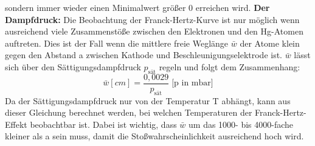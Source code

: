sondern immer wieder einen Minimalwert größer 0 erreichen wird.\newline
\textbf{Der Dampfdruck:}\newline
Die Beobachtung der Franck-Hertz-Kurve ist nur möglich wenn ausreichend viele Zusammenstöße zwischen den Elektronen und den Hg-Atomen auftreten. Dies ist der Fall  wenn die mittlere freie Weglänge $\bar{w}$ der Atome klein gegen den Abstand a zwischen Kathode und Beschleunigungselektrode ist. $\bar{w}$ lässt sich über den Sättigungsdampfdruck $p_{\text{sät}}$ regeln und folgt dem Zusammenhang:
\begin{equation*}
    \bar w [cm] = \frac{0,0029}{p_{\text{sät}}} \;\text{[p in mbar]}
\end{equation*}
\noindent
Da der Sättigungsdampfdruck nur von der Temperatur T abhängt, kann aus dieser Gleichung berechnet werden, bei welchen Temperaturen der Franck-Hertz-Effekt beobachtbar ist. Dabei ist wichtig, dass $\bar{w}$ um das 1000- bis 4000-fache
kleiner als a sein muss, damit die Stoßwahrscheinlichkeit ausreichend hoch wird.